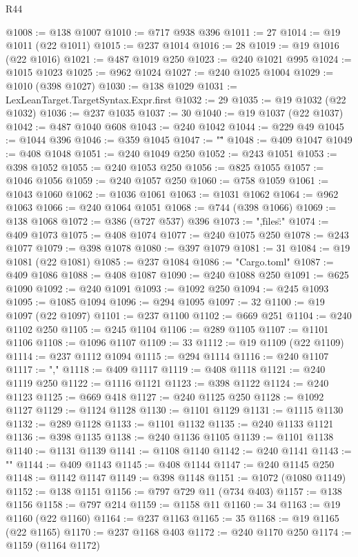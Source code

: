 \begin{lexlean}{R44}
\begin{coremodule}
@1008 := @138 @1007
@1010 := @717 @938 @396
@1011 := 27
@1014 := @19 @1011 (@22 @1011)
@1015 := @237 @1014
@1016 := 28
@1019 := @19 @1016 (@22 @1016)
@1021 := @487 @1019 @250
@1023 := @240 @1021 @995
@1024 := @1015 @1023
@1025 := @962 @1024
@1027 := @240 @1025 @1004
@1029 := @1010 (@398 @1027)
@1030 := @138 @1029
@1031 := LexLeanTarget.TargetSyntax.Expr.first
@1032 := 29
@1035 := @19 @1032 (@22 @1032)
@1036 := @237 @1035
@1037 := 30
@1040 := @19 @1037 (@22 @1037)
@1042 := @487 @1040 @608
@1043 := @240 @1042
@1044 := @229 @49
@1045 := @1044 @396
@1046 := @359 @1045
@1047 := "\""
@1048 := @409 @1047
@1049 := @408 @1048
@1051 := @240 @1049 @250
@1052 := @243 @1051
@1053 := @398 @1052
@1055 := @240 @1053 @250
@1056 := @825 @1055
@1057 := @1046 @1056
@1059 := @240 @1057 @250
@1060 := @758 @1059
@1061 := @1043 @1060
@1062 := @1036 @1061
@1063 := @1031 @1062
@1064 := @962 @1063
@1066 := @240 @1064 @1051
@1068 := @744 (@398 @1066)
@1069 := @138 @1068
@1072 := @386 (@727 @537) @396
@1073 := ",\"files\":{"
@1074 := @409 @1073
@1075 := @408 @1074
@1077 := @240 @1075 @250
@1078 := @243 @1077
@1079 := @398 @1078
@1080 := @397 @1079
@1081 := 31
@1084 := @19 @1081 (@22 @1081)
@1085 := @237 @1084
@1086 := "Cargo.toml"
@1087 := @409 @1086
@1088 := @408 @1087
@1090 := @240 @1088 @250
@1091 := @625 @1090
@1092 := @240 @1091
@1093 := @1092 @250
@1094 := @245 @1093
@1095 := @1085 @1094
@1096 := @294 @1095
@1097 := 32
@1100 := @19 @1097 (@22 @1097)
@1101 := @237 @1100
@1102 := @669 @251
@1104 := @240 @1102 @250
@1105 := @245 @1104
@1106 := @289 @1105
@1107 := @1101 @1106
@1108 := @1096 @1107
@1109 := 33
@1112 := @19 @1109 (@22 @1109)
@1114 := @237 @1112 @1094
@1115 := @294 @1114
@1116 := @240 @1107
@1117 := ","
@1118 := @409 @1117
@1119 := @408 @1118
@1121 := @240 @1119 @250
@1122 := @1116 @1121
@1123 := @398 @1122
@1124 := @240 @1123
@1125 := @669 @418
@1127 := @240 @1125 @250
@1128 := @1092 @1127
@1129 := @1124 @1128
@1130 := @1101 @1129
@1131 := @1115 @1130
@1132 := @289 @1128
@1133 := @1101 @1132
@1135 := @240 @1133 @1121
@1136 := @398 @1135
@1138 := @240 @1136 @1105
@1139 := @1101 @1138
@1140 := @1131 @1139
@1141 := @1108 @1140
@1142 := @240 @1141
@1143 := "}"
@1144 := @409 @1143
@1145 := @408 @1144
@1147 := @240 @1145 @250
@1148 := @1142 @1147
@1149 := @398 @1148
@1151 := @1072 (@1080 @1149)
@1152 := @138 @1151
@1156 := @797 @729 @11 (@734 @403)
@1157 := @138 @1156
@1158 := @797 @214
@1159 := @1158 @11
@1160 := 34
@1163 := @19 @1160 (@22 @1160)
@1164 := @237 @1163
@1165 := 35
@1168 := @19 @1165 (@22 @1165)
@1170 := @237 @1168 @403
@1172 := @240 @1170 @250
@1174 := @1159 (@1164 @1172)

\end{coremodule}
\end{lexlean}
